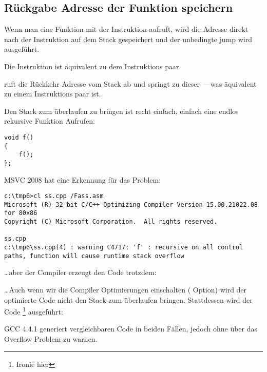 \subsection{Rückgabe Adresse der Funktion speichern}


Wenn man eine Funktion mit der \CALL Instruktion aufruft, wird die Adresse direkt nach der
\CALL Instruktion auf dem Stack gespeichert und der unbedingte jump wird ausgeführt.

Die \CALL Instruktion ist äquivalent zu dem  Instruktions paar.

\RET ruft die Rückkehr Adresse vom Stack ab und springt zu dieser~---was äquivalent zu einem  Instruktions
paar ist.

\myindex{\Stack!\MLStackOverflow}
\myindex{\Recursion}

Den Stack zum überlaufen zu bringen ist recht einfach, einfach eine 
endlos rekursive Funktion Aufrufen:


\begin{lstlisting}[style=customc]
void f()
{
	f();
};
\end{lstlisting}


MSVC 2008 hat eine Erkennung für das Problem:


\begin{lstlisting}
c:\tmp6>cl ss.cpp /Fass.asm
Microsoft (R) 32-bit C/C++ Optimizing Compiler Version 15.00.21022.08 for 80x86
Copyright (C) Microsoft Corporation.  All rights reserved.

ss.cpp
c:\tmp6\ss.cpp(4) : warning C4717: 'f' : recursive on all control paths, function will cause runtime stack overflow
\end{lstlisting}

\dots aber der Compiler erzeugt den Code trotzdem:



\dots Auch wenn wir die Compiler Optimierungen einschalten ( Option) wird der optimierte Code nicht
den Stack zum überlaufen bringen. Stattdessen wird der Code \footnote{Ironie hier} ausgeführt: 



GCC 4.4.1 generiert vergleichbaren Code in beiden Fällen, jedoch ohne über das Overflow Problem zu warnen.

